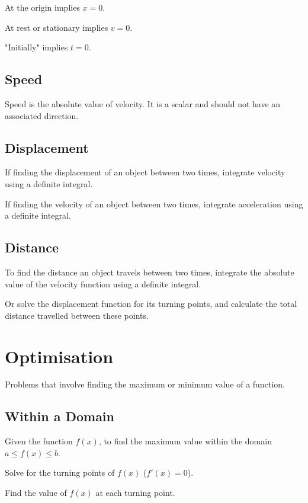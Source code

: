 \documentclass[a4paper,11pt]{article}
\begin{document}
At the origin implies $x = 0$.

At rest or stationary implies $v = 0$.

"Initially" implies $t = 0$.


\subsection{Speed}

Speed is the absolute value of velocity. It is a scalar and should not have an
associated direction.


\subsection{Displacement}

If finding the displacement of an object between two times, integrate velocity
using a definite integral.

If finding the velocity of an object between two times, integrate acceleration
using a definite integral.


\subsection{Distance}

To find the distance an object travels between two times, integrate the absolute
value of the velocity function using a definite integral.

Or solve the displacement function for its turning points, and calculate the
total distance travelled between these points.




\section{Optimisation}

Problems that involve finding the maximum or minimum value of a function.


\subsection{Within a Domain}

Given the function $f(x)$, to find the maximum value within the domain
$a \leq f(x) \leq b$.

Solve for the turning points of $f(x)$ ($f'(x) = 0$).

Find the value of $f(x)$ at each turning point.
\end{document}
